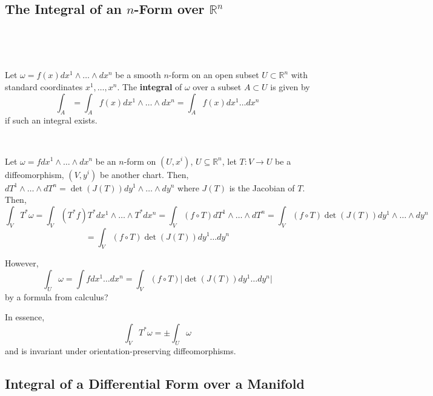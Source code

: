 \documentclass{article}
\begin{document}
\subsection{The Integral of an $n$-Form over $\mathbb{R}^n$}
\

\begin{definition}
  \

  Let $\omega = f(x) dx^1 \wedge \dots \wedge dx^n$ be a smooth $n$-form on an open subset $U \subset \mathbb{R}^n$ with standard coordinates $x^1, \dots, x^n$. The \textbf{integral} of $\omega$ over a subset $A \subset U$ is given by $$\int_A = \int_A f(x)dx^1\wedge\dots\wedge dx^n = \int_A f(x)dx^1\dots dx^n$$if such an integral exists.
\end{definition}

\begin{example}
  \

  Let $\omega = fdx^1 \wedge \dots \wedge dx^n$ be an $n$-form on $(U, x^i)$, $U\subseteq \mathbb{R}^n$, let $T: V \to U$ be a diffeomorphism, $(V, y^i)$ be another chart. Then, $dT^1 \wedge \dots \wedge dT^n = \det(J(T))dy^1 \wedge \dots \wedge dy^n$ where $J(T)$ is the Jacobian of $T$. Then, $$\int_V T^*\omega = \int_V (T^*f)T^*dx^1 \wedge \dots \wedge T^*dx^n = \int_V (f \circ T) dT^1 \wedge \dots \wedge dT^n = \int_V (f \circ T)\det(J(T))dy^1 \wedge \dots \wedge dy^n$$$$= \int_V(f \circ T)\det(J(T))dy^1\dots dy^n$$

  However, $$\int_U \omega = \int f dx^1\dots dx^n = \int_V (f \circ T) \vert \det(J(T)) dy^1 \dots dy^n\vert$$by a formula from calculus?

  In essence, $$\int_V T^* \omega = \pm \int_U \omega$$and is invariant under orientation-preserving diffeomorphisms.
\end{example}

\subsection{Integral of a Differential Form over a Manifold}
\
\end{document}
